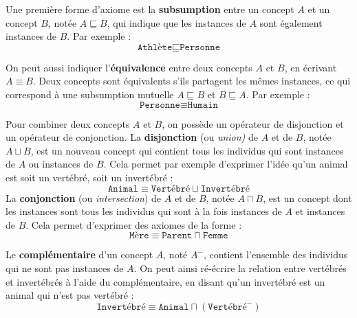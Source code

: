 Une première forme d'axiome est la \textbf{subsumption} entre un concept $A$ et un concept $B$, notée $A \sqsubseteq B$, qui indique que les instances de $A$ sont également instances de $B$. Par exemple :
\begin{equation}
    \texttt{Athlète} \sqsubseteq \texttt{Personne}
\end{equation}

On peut aussi indiquer l'\textbf{équivalence} entre deux concepts $A$ et $B$, en écrivant $A \equiv B$. Deux concepts sont équivalents s'ils partagent les mêmes instances, ce qui correspond à une subsumption mutuelle $A \sqsubseteq B$ et $B \sqsubseteq A$. Par exemple :
\begin{equation}
    \texttt{Personne} \equiv \texttt{Humain}
\end{equation}

Pour combiner deux concepts $A$ et $B$, on possède un opérateur de disjonction et un opérateur de conjonction. La \textbf{disjonction} (ou \textit{union)} de $A$ et de $B$, notée $A \sqcup B$, est un nouveau concept qui contient tous les individus qui sont instances de $A$ ou instances de $B$. Cela permet par exemple d'exprimer l'idée qu'un animal est soit un vertébré, soit un invertébré :
\begin{equation}
    \texttt{Animal} \equiv \texttt{Vertébré} \sqcup \texttt{Invertébré}
\end{equation}
La \textbf{conjonction} (ou \textit{intersection}) de $A$ et de $B$, notée $A \sqcap B$, est un concept dont les instances sont tous les individus qui sont à la fois instances de $A$ et instances de $B$. Cela permet d'exprimer des axiomes de la forme :
\begin{equation}
    \texttt{Mère} \equiv \texttt{Parent} \sqcap \texttt{Femme}
\end{equation}

Le \textbf{complémentaire} d'un concept $A$, noté $A^-$, contient l'ensemble des individus qui ne sont pas instances de $A$. On peut ainsi ré-écrire la relation entre vertébrés et invertébrés à l'aide du complémentaire, en disant qu'un invertébré est un animal qui n'est pas vertébré :
\begin{equation}
    \texttt{Invertébré} \equiv \texttt{Animal} \sqcap (\texttt{Vertébré}^-)
\end{equation}

